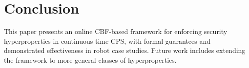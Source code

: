\documentclass[journal,twoside,web]{ieeecolor}
\begin{document}


\section{Conclusion}
\label{sec:conclusion}

This paper presents an online CBF-based framework for enforcing security hyperproperties in continuous-time CPS, with formal guarantees and demonstrated effectiveness in robot case studies. Future work includes extending the framework to more general classes of hyperproperties.
 


\end{document}
